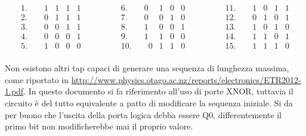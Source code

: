 \begin{equation*}
\begin{matrix}
1.	\qquad	1	&	1	&	1	&	1	\\
2.	\qquad	0	&	1	&	1	&	1	\\
3.	\qquad	0	&	0	&	1	&	1	\\
4.	\qquad	0	&	0	&	0	&	1	\\
5.	\qquad	1	&	0	&	0	&	0	\\

\end{matrix}
\qquad \qquad
\begin{matrix}

6.	\qquad	0	&	1	&	0	&	0	\\
7.	\qquad	0	&	0	&	1	&	0	\\
8.	\qquad	1	&	0	&	0	&	1	\\
9.	\qquad	1	&	1	&	0	&	0	\\
10.	\qquad	0	&	1	&	1	&	0	\\
\end{matrix}
\qquad \qquad
\begin{matrix}

11.	\qquad	1	&	0	&	1	&	1	\\
12.	\qquad	0	&	1	&	0	&	1	\\
13.	\qquad	1	&	0	&	1	&	0	\\
14.	\qquad	1	&	1	&	0	&	1	\\
15.	\qquad	1	&	1	&	1	&	0	\\
\end{matrix}
\end{equation*}

Non esistono altri tap capaci di generare una sequenza di lunghezza massima, come riportato in \href{http://www.physics.otago.ac.nz/reports/electronics/ETR2012-1.pdf}{http://www.physics.otago.ac.nz/reports/electronics/ETR2012-1.pdf}.
In questo documento si fa riferimento all'uso di porte XNOR, tuttavia il circuito è del tutto equivalente a patto di modificare la sequenza iniziale. Si da per buono che l'uscita della porta logica debba essere Q0, differentemente il primo bit non modificherebbe mai il proprio valore.

